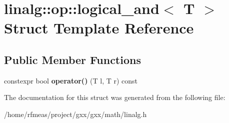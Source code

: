 \hypertarget{structlinalg_1_1op_1_1logical__and}{}\section{linalg\+:\+:op\+:\+:logical\+\_\+and$<$ T $>$ Struct Template Reference}
\label{structlinalg_1_1op_1_1logical__and}
\subsection*{Public Member Functions}
\begin{DoxyCompactItemize}
\item 
constexpr bool {\bfseries operator()} (T l, T r) const \hypertarget{structlinalg_1_1op_1_1logical__and_a43a5734e93e96a853cb0e79984081af2}{}\label{structlinalg_1_1op_1_1logical__and_a43a5734e93e96a853cb0e79984081af2}

\end{DoxyCompactItemize}


The documentation for this struct was generated from the following file\+:\begin{DoxyCompactItemize}
\item 
/home/rfmeas/project/gxx/gxx/math/linalg.\+h\end{DoxyCompactItemize}
